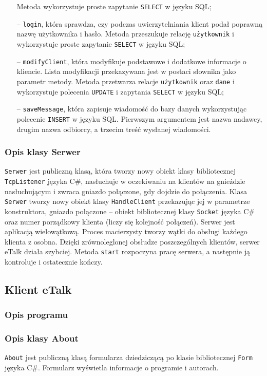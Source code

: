 \documentclass[a4paper,12pt]{article}
\begin{document}
\begin{itemize}
              Metoda wykorzystuje proste zapytanie \texttt{SELECT} w języku SQL;
    \item[--] \texttt{login}, która sprawdza, czy podczas uwierzytelniania klient podał poprawną nazwę użytkownika i hasło. Metoda przeszukuje relację \texttt{użytkownik} i wykorzystuje proste zapytanie \texttt{SELECT} w języku SQL;
    \item[--] \texttt{modifyClient}, która modyfikuje podstawowe i dodatkowe informacje o kliencie. Lista modyfikacji przekazywana jest w postaci słownika jako parametr metody.
        Metoda przetwarza relacje \texttt{użytkownik} oraz \texttt{dane} i wykorzystuje polecenia \texttt{UPDATE} i zapytania \texttt{SELECT} w języku SQL;
    \item[--] \texttt{saveMessage}, która zapisuje wiadomość do bazy danych wykorzystując polecenie \texttt{INSERT} w języku SQL.
              Pierwszym argumentem jest nazwa nadawcy, drugim nazwa odbiorcy, a trzecim treść wysłanej wiadomości.
\end{itemize}

\subsubsection[Opis klasy Serwer]{Opis klasy Serwer}
\texttt{Serwer} jest publiczną klasą, która tworzy nowy obiekt klasy bibliotecznej \texttt{TcpListener} języka C\#, nasłuchuje w oczekiwaniu na klientów na gnieździe nasłuchującym i zwraca gniazdo połączone, gdy dojdzie do połączenia.
Klasa \texttt{Serwer} tworzy nowy obiekt klasy \texttt{HandleClient} przekazując jej w parametrze konstruktora, gniazdo połączone -- obiekt bibliotecznej klasy \texttt{Socket} języka C\# oraz numer porządkowy klienta (liczy się kolejność połączeń). Serwer jest aplikacją wielowątkową. Proces macierzysty tworzy wątki do obsługi każdego klienta z osobna. Dzięki zrównoleglonej obsłudze poszczególnych klientów, serwer eTalk działa szybciej. Metoda \texttt{start} rozpoczyna pracę serwera, a następnie ją kontroluje i ostatecznie kończy.


\subsection[Klient eTalk]{Klient eTalk}
\subsubsection[Opis programu]{Opis programu}

\subsubsection[Opis klasy About]{Opis klasy About}
\texttt{About} jest publiczną klasą formularza dziedziczącą po klasie bibliotecznej \texttt{Form}
języka C\#. Formularz wyświetla informacje o programie i autorach.
\end{document}
